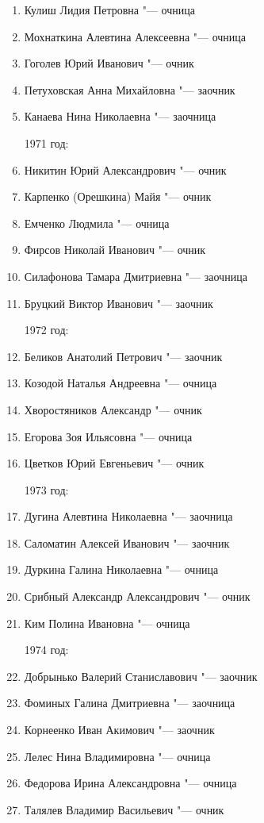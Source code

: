 \noindent\hspace*{\leftmargin}{1970 год:}
\begin{enumerate}[nosep]
	\item Кулиш Лидия Петровна "--- очница
	\item Мохнаткина Алевтина Алексеевна "--- очница
	\item Гоголев Юрий Иванович "--- очник
	\item Петуховская Анна Михайловна "--- заочник
	\item Канаева Нина Николаевна "--- заочница
	
{1971 год:}
	\item Никитин Юрий Александрович "--- очник
	\item Карпенко (Орешкина) Майя "--- очник
	\item Емченко Людмила "--- очница
	\item Фирсов Николай Иванович "--- очник
	\item Силафонова Тамара Дмитриевна "--- заочница
	\item Бруцкий Виктор Иванович "--- заочник
	
{1972 год:}
	\item Беликов Анатолий Петрович "--- заочник
	\item Козодой Наталья Андреевна "--- очница
	\item Хворостяников Александр "--- очник
	\item Егорова Зоя Ильясовна "--- очница
	\item Цветков Юрий Евгеньевич "--- очник
	
{1973 год:}
	\item Дугина Алевтина Николаевна "--- заочница
	\item Саломатин Алексей Иванович "--- заочник
	\item Дуркина Галина Николаевна "--- очница
	\item Срибный Александр Александрович "--- очник
	\item Ким Полина Ивановна "--- очница
	
{1974 год:}
	\item Добрынько Валерий Станиславович "--- заочник
	\item Фоминых Галина Дмитриевна "--- заочница
	\item Корнеенко Иван Акимович "--- заочник
	\item Лелес Нина Владимировна "--- очница
	\item Федорова Ирина Александровна "--- очница
	\item Талялев Владимир Васильевич "--- очник
	

\end{enumerate}
